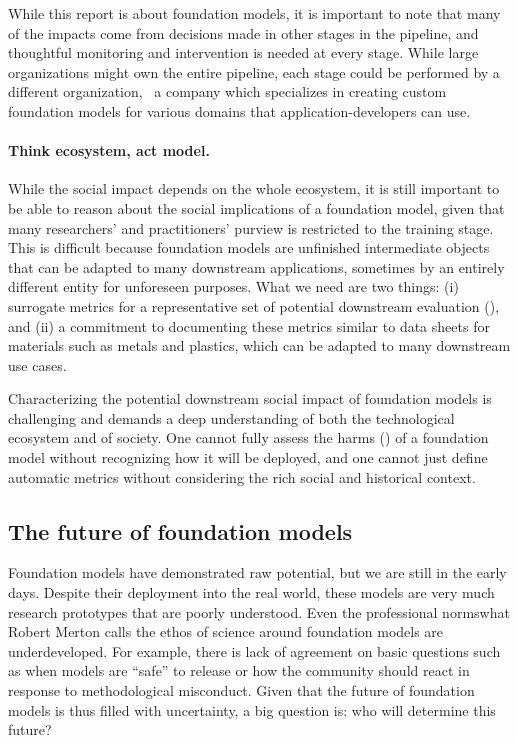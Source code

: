 While this report is about foundation models,
it is important to note that many of the impacts come from decisions made in
other stages in the pipeline,
and thoughtful monitoring and intervention is needed at every stage.
While large organizations might own the entire pipeline,
each stage could be performed by a different organization,
\eg~a company which specializes in creating custom foundation models for
various domains that application-developers can use.

\paragraph{Think ecosystem, act model.}
While the social impact depends on the whole ecosystem,
it is still important to be able to reason about the social implications of a foundation model,
given that many researchers' and practitioners' purview is restricted to the training stage.
This is difficult because foundation models are unfinished intermediate
objects that can be adapted to many downstream applications, sometimes by an
entirely different entity for unforeseen purposes.
What we need are two things:
(i) surrogate metrics for a representative set of potential downstream evaluation (),
and (ii) a commitment to documenting these metrics \citep{Mitchell_2019}
similar to data sheets for materials such as metals and plastics,
which can be adapted to many downstream use cases.

Characterizing the potential downstream social impact of foundation models
is challenging and demands a deep understanding of both the technological ecosystem
and of society.
One cannot fully assess the harms () of a foundation model without recognizing how it will be deployed,
and one cannot just define automatic metrics without considering the rich social and historical context.

\subsection{The future of foundation models}
\label{sec:developers}

Foundation models have demonstrated raw potential,
but we are still in the early days.
Despite their deployment into the real world,
these models are very much research prototypes that are poorly understood.
Even the professional norms\dash{}what Robert Merton calls the ethos of science \citep{merton1979normative}\dash{}around foundation models are underdeveloped.
For example, there is lack of agreement on basic questions such as when models are ``safe'' to release
or how the community should react in response to methodological misconduct.
Given that the future of foundation models is thus filled with uncertainty,
a big question is: who will determine this future?

